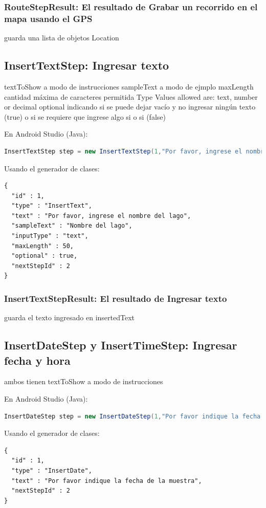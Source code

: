 \subsubsection{RouteStepResult: El resultado de Grabar un recorrido en el mapa usando el GPS}
guarda una lista de objetos Location

\subsection{InsertTextStep: Ingresar texto}
textToShow a modo de instrucciones
sampleText a modo de ejmplo
maxLength cantidad máxima de caracteres permitida
Type Values allowed are: text, number or decimal
optional indicando si se puede dejar vacío y no ingresar ningún texto (true) o si se requiere que ingrese algo si o si (false)


En Android Studio (Java):
\begin{lstlisting}[language=Java, frame=tlb]	
InsertTextStep step = new InsertTextStep(1,"Por favor, ingrese el nombre del lago","Nombre del lago",50,InsertTextStep.InputType.TYPE_TEXT,true,2);
\end{lstlisting}

Usando el generador de clases:
\begin{lstlisting}[language=XML, frame=tlb]	
{
  "id" : 1,
  "type" : "InsertText",
  "text" : "Por favor, ingrese el nombre del lago",
  "sampleText" : "Nombre del lago",
  "inputType" : "text",
  "maxLength" : 50,
  "optional" : true,
  "nextStepId" : 2
}
\end{lstlisting}

\subsubsection{InsertTextStepResult: El resultado de Ingresar texto}
guarda el texto ingresado en insertedText

\subsection{InsertDateStep y InsertTimeStep: Ingresar fecha y hora}
ambos tienen textToShow a modo de instrucciones

En Android Studio (Java):
\begin{lstlisting}[language=Java, frame=tlb]	
InsertDateStep step = new InsertDateStep(1,"Por favor indique la fecha de la muestra",2); 
\end{lstlisting}

Usando el generador de clases:
\begin{lstlisting}[language=XML, frame=tlb]	
{
  "id" : 1,
  "type" : "InsertDate",
  "text" : "Por favor indique la fecha de la muestra",
  "nextStepId" : 2
}
\end{lstlisting}

